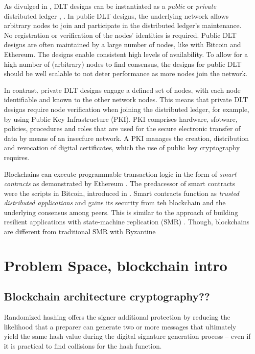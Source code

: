 \documentclass{report}
\begin{document}
\begin{flushleft}
As divulged in \cite{sunyaev_distributed_2020}, DLT designs can be instantiated as a \emph{public} or \emph{private} distributed ledger \cite{yeow_decentralized_2018}, \cite{xu_taxonomy_2017}.
In public DLT designs, the underlying network allows arbitrary nodes to join and participate in the distributed ledger's maintenance. No registration or verification of the nodes' identities is required.
Public DLT designs are often maintained by a large number of nodes, like with Bitcoin and Ethereum. The designs enable consistent high levels of availability. 
To allow for a high number of (arbitrary) nodes to find consensus, the designs for public DLT should be well scalable to not deter performance as more nodes join the network. \cite{sunyaev_distributed_2020}

In contrast, private DLT designs engage a defined set of nodes, with each node identifiable and known to the other network nodes. This means that private DLT designs require node verification when joining the distributed ledger, for example, by using Public Key Infrastructure (PKI).
PKI comprises hardware, sfotware, policies, procedures and roles that are used for the secure electronic transfer of data by means of an insecfure network. A PKI manages the creation, distribution and revocation of digital certificates, which the use of public key cryptography requires. \cite{sunyaev_distributed_2020}

Blockchains can execute programmable transaction logic in the form of \emph{smart contracts} as demonstrated by Ethereum \cite{noauthor_ethereum_nodate}.
The predacessor of smart contracts were the scripts in Bitcoin, introduced in \cite{nakamoto_bitcoin_2019}.
Smart contracts function as \emph{trusted distributed applications} and gains its security from teh blockchain and the underlying consensus among peers.
This is similar to the approach of building resilient applications with state-machine replication (SMR) \cite{schneider_implementing_1990}.
Though, blockchains are different from traditional SMR with Byzantine 

\section{Problem Space, blockchain intro } %

\subsection{Blockchain architecture cryptography??}
Randomized hashing offers the signer additional protection by reducing the likelihood that a preparer can generate two or more messages 
that ultimately yield the same hash value during the digital signature generation process – even if it is practical to find collisions for the hash function. 


\end{flushleft}
\end{document}

